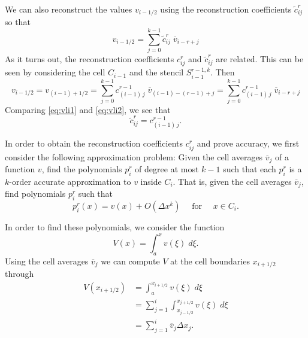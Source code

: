 \documentclass{article}
\newcommand{\for}[0]{\quad \text{ for } \quad}
\newcommand{\xri}[0]{x_{i+1/2}}
\newcommand{\xlj}[0]{x_{j-1/2}}
\newcommand{\xrj}[0]{x_{j+1/2}}
\newcommand{\vli}[0]{v_{i-1/2}}
\numberwithin{equation}{section}
\begin{document}
We can also reconstruct the values $\vli$ using the reconstruction
coefficients $\tilde{c}^r_{ij}$ so that
\begin{equation}
  \label{eq:vli1}
  \vli = \sum_{j=0}^{k-1} \tilde{c}^r_{ij}\; \overline{v}_{i-r+j}
\end{equation}
As it turns out, the reconstruction coefficients $c^r_{ij}$ and
$\tilde{c}^r_{ij}$ are related.  This can be seen by considering the
cell $C_{i-1}$ and the stencil $S_{i-1}^{r-1,k}$.  Then
\begin{equation}
  \label{eq:vli2}
  \vli = v_{(i-1)+1/2}
    = \sum_{j=0}^{k-1} c^{r-1}_{(i-1)\,j}\; \overline{v}_{(i-1)-(r-1)+j}
    = \sum_{j=0}^{k-1} c^{r-1}_{(i-1)\,j}\; \overline{v}_{i-r+j}
\end{equation}
Comparing \eqref{eq:vli1} and \eqref{eq:vli2}, we see that
\begin{equation*}
  \tilde{c}^r_{ij} = c^{r-1}_{(i-1)\, j}.
\end{equation*}

In order to obtain the reconstruction coefficients $c^r_{ij}$ and
prove accuracy, we first consider the following approximation problem:
Given the cell averages $\overline{v}_j$ of a function $v$, find the
polynomials $p^r_i$ of degree at most $k-1$ such that each $p^r_i$ is
a $k$-order accurate approximation to $v$ inside $C_i$.  That is,
given the cell averages $\overline{v}_j$, find polynomials $p^r_i$
such that
\begin{equation*}
  p^r_i(x) = v(x) + O(\Delta x^k) \for x \in C_i.
\end{equation*}

In order to find these polynomials, we consider the function
\begin{equation}
  \label{eq:V}
  V(x) = \int_a^x v(\xi) \;d\xi.
\end{equation}
Using the cell averages $\overline{v}_j$ we can compute $V$ at the
cell boundaries $\xri$ through
\begin{align}
  V(\xri) &= \int_a^{\xri} v(\xi) \;d\xi \nonumber \\
          &= \sum_{j=1}^i \int_{\xlj}^{\xrj} v(\xi) \;d\xi \nonumber \\
          &= \sum_{j=1}^i \overline{v}_j \Delta x_j.
          \label{eq:Vsum}
\end{align}
\end{document}
